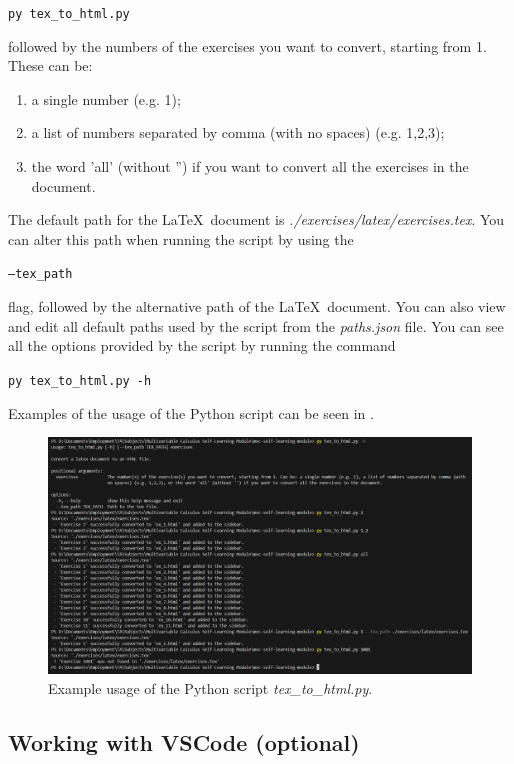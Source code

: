 \documentclass[a4paper,10pt]{article}
\begin{document}
\texttt{py tex\_to\_html.py} 

followed by the numbers of the exercises you want to convert, starting from 1. These can be:
\begin{enumerate}
    \item a single number (e.g. 1);
    \item a list of numbers separated by comma (with no spaces) (e.g. 1,2,3);
    \item the word 'all' (without '') if you want to convert all the exercises in the document.
\end{enumerate}

The default path for the \LaTeX\ document is \emph{./exercises/latex/exercises.tex}. You can alter this path when running the script by using the

\texttt{--tex\_path}

flag, followed by the alternative path of the \LaTeX\ document. You can also view and edit all default paths used by the script from the \emph{paths.json} file. You can see all the options provided by the script by running the command

\texttt{py tex\_to\_html.py -h}

Examples of the usage of the Python script can be seen in .

\begin{figure}[htbp]
    \centering
    \includegraphics[width=\textwidth]{tex_to_html.png}
    \caption{Example usage of the Python script \emph{tex\_to\_html.py}.}
    \label{fig:tex_to_html}   
\end{figure}


\subsection{Working with VSCode (optional)}
\end{document}
